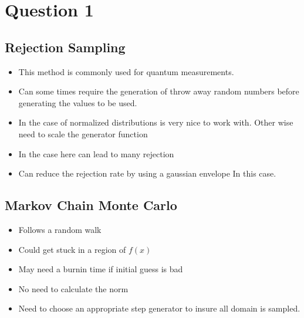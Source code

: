 \documentclass{article}
\begin{document}
\section{Question 1}

\subsection{Rejection Sampling}

\begin{itemize}
\itemsep-0.3cm 
\item This method is commonly used for quantum measurements.\citep{Rivas2011} \\
\item Can some times require the generation of throw away random numbers before generating the values to be used. \\
\item In the case of normalized distributions is very nice to work with. Other wise need to scale the generator function \citep{JakeRS}\\
\item In the case here can lead to many rejection \\
\item Can reduce the rejection rate by using a gaussian envelope In this case. \citep{RelSRS}\\
\end{itemize}




\subsection{Markov Chain Monte Carlo}

\begin{itemize}
\itemsep-0.3cm 
\item Follows a random walk \\
\item Could get stuck in a region of $f(x)$\citep{robert2016metropolishastingsalgorithm} \\
\item May need a burnin time if initial guess is bad\citep{DMHA}\\
\item No need to calculate the norm\\ 
\item Need to choose an appropriate step generator to insure all domain is sampled.\\
\end{itemize}
\end{document}
